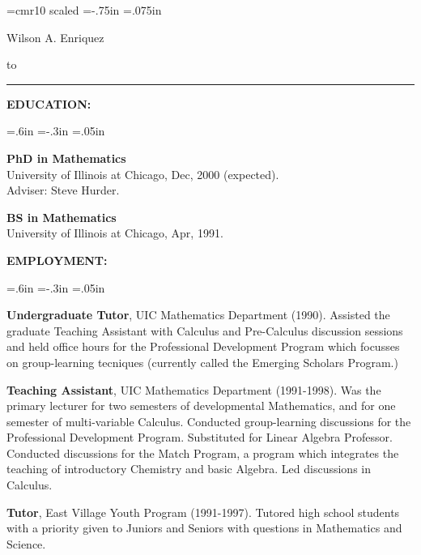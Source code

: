 
\oddsidemargin 0pt \evensidemargin 0pt
\topmargin=1.25in
\headheight 10pt \headsep 10pt \footheight 10pt \footskip 24pt
\textheight 10in \textwidth 6.5in \columnsep 10pt \columnseprule 0pt

\font\namefont=cmr10 scaled
\voffset=-.75in
\parskip=.075in
\parindent=0in

\thispagestyle{empty}

\bigskip
\centerline{\namefont Wilson A. Enriquez}
\bigskip

\hbox to 
\vspace{.1 in}
\hrule
{}   \hfill

{\bf EDUCATION: }

{ \leftskip=.6in \parindent=-.3in  \parskip=.05in

{\bf PhD in Mathematics}
\\University of Illinois at Chicago, Dec, 2000 (expected).
\\Adviser: Steve Hurder.

{\bf BS in Mathematics} 
\\University of Illinois at Chicago, Apr, 1991.

}

{\bf EMPLOYMENT:}

{\leftskip=.6in  \parindent=-.3in  \parskip=.05in


{\bf Undergraduate Tutor}, UIC Mathematics Department (1990).  Assisted the graduate Teaching Assistant with Calculus and Pre-Calculus discussion sessions and held office hours for the Professional Development Program which focusses on group-learning tecniques (currently called the Emerging Scholars Program.)   

{\bf Teaching Assistant}, UIC Mathematics Department
(1991-1998).  Was the primary lecturer for two semesters of developmental Mathematics, and for one semester of multi-variable Calculus.  Conducted group-learning discussions for the Professional Development Program.  Substituted for Linear Algebra Professor.  Conducted discussions for the Match Program, a program which integrates the teaching of  introductory Chemistry and basic Algebra.  Led discussions in Calculus.

{\bf Tutor}, East Village Youth Program (1991-1997). Tutored high school students with a priority given to Juniors and Seniors with questions in Mathematics and Science.
\vspace{.04 in}

\mbox{}
}
\vspace{-.2in}

